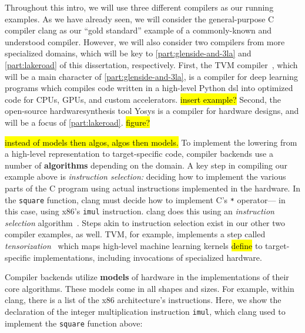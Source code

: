 Throughout this intro,
  we will use three different compilers
  as our running examples.
As we have already seen, we will
  consider the
  general-purpose C compiler
  clang
  as our ``gold standard'' example
  of a commonly-known
  and understood compiler.
However, we will also consider
  two compilers from more specialized
  domains,
  which will be key to
  \cref{part:glenside-and-3la}
  and
  \cref{part:lakeroad}
  of this dissertation,
  respectively.
First,
  the TVM compiler~\cite{tvm,chen2018tvm},
  which will be a main character
  of \cref{part:glenside-and-3la},
  is a compiler for deep learning
  programs
  which compiles code written in a
  high-level
  Python
  \gls{dsl}
  into optimized code
  for CPUs, GPUs,
  and custom accelerators.
\hl{ insert example?}
Second,
  the open-source \gls{hardwaresynthesis}
  tool Yosys
  is a compiler for hardware designs,
  and will be a focus of
  \cref{part:lakeroad}.
\hl{figure?}

\hl{instead of models then algos, algos then models.}
To implement the lowering
  from a high-level representation
  to target-specific code,
  compiler backends use a number of
  \textbf{algorithms}
  depending on the domain.
A key step in 
  compiling our
  example above
  is
  \textit{instruction selection:}
  deciding how to implement
  the various parts of the C program
  using actual instructions
  implemented in the hardware.
In the \texttt{square} function,
  clang must decide how to implement
  C's \texttt{*} operator---%
  in this case, using x86's
  \texttt{imul} instruction.
clang does this using
  an \textit{instruction selection}
  algorithm~\cite{llvminstructionselection}.
Steps akin to instruction selection
  exist in our other two compiler examples,
  as well.
TVM, for example, implements a step
  called 
  \textit{tensorization}~\cite{tvmtensorization}
  which maps high-level 
  machine learning kernels \hl{define}
  to target-specific implementations,
  including invocations
  of specialized hardware.

Compiler backends 
  utilize \textbf{models} of hardware
  in the implementations 
  of their core algorithms.
These models come in all shapes
  and sizes.
For example,
  within clang, there is a list
  of the x86 architecture's
  instructions.
Here,
  we show the declaration of
  the integer multiplication
  instruction
  \texttt{imul},
  which clang used to implement
  the \texttt{square} function above:
  
